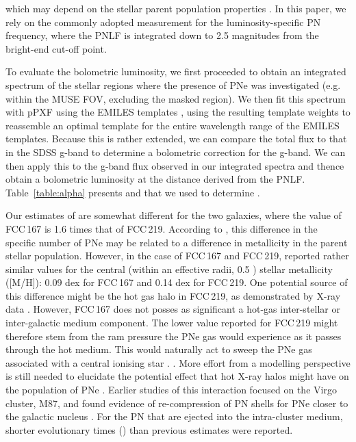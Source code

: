 \documentclass{aa}
\begin{document}
which may depend on the stellar parent population properties \citep[e.g.][]{buzzoni_planetary_2006}. In this paper, we rely on the commonly adopted  measurement for the luminosity-specific PN frequency, where the PNLF is integrated down to 2.5 magnitudes from the bright-end cut-off point.


To evaluate the bolometric luminosity, we first proceeded to obtain an integrated spectrum of the stellar regions where the presence of PNe was investigated (e.g. within the MUSE FOV, excluding the masked region). We then fit this spectrum with pPXF using the EMILES templates \citep{vazdekis_uv-extended_2016}, using the resulting template weights to reassemble an optimal template for the entire wavelength range of the EMILES templates. Because this is rather extended, we can compare the total flux to that in the SDSS g-band to determine a bolometric correction for the g-band. We can then apply this to the g-band flux observed in our integrated spectra and thence obtain a bolometric luminosity at the distance derived from the PNLF. Table~\ref{table:alpha} presents  and  that we used to determine .


Our estimates of  are somewhat different for the two galaxies, where the value of FCC\,167 is 1.6 times that of FCC\,219. According to \citet{buzzoni_planetary_2006}, this difference in the specific number of PNe may be related to a difference in metallicity in the parent stellar population. However, in the case of FCC\,167 and FCC\,219, \citet{iodice_fornax3d_2019} reported rather similar values for the central (within an effective radii, 0.5 ) stellar metallicity ([M/H]): 0.09 dex for FCC\,167 and 0.14 dex for FCC\,219. One potential source of this difference might be the hot gas halo in FCC\,219, as demonstrated by X-ray data \citep[e.g.][]{jones_xray_1997, murakami_suzaku_2011}. However, FCC\,167 does not posses as significant a hot-gas inter-stellar or  inter-galactic medium component. The lower  value reported for FCC\,219 might therefore stem from the ram pressure the PNe gas would experience as it passes through the hot medium. This would naturally act to sweep the PNe gas associated with a central ionising star \citep{conroy_preventing_2015}. \citep{}. More effort from a modelling perspective is still needed to elucidate the potential effect that hot X-ray halos might have on the population of PNe \citep[e.g. following ][]{li_fate_2019}. Earlier studies of this interaction focused on the Virgo cluster, M87, and found evidence of re-compression of PN shells for PNe closer to the galactic nucleus \citep{dopita_nuclei_2000}. For the PN that are ejected into the intra-cluster medium, shorter evolutionary times () than previous estimates \citep{villaver_survival_2005} were reported.
\end{document}

